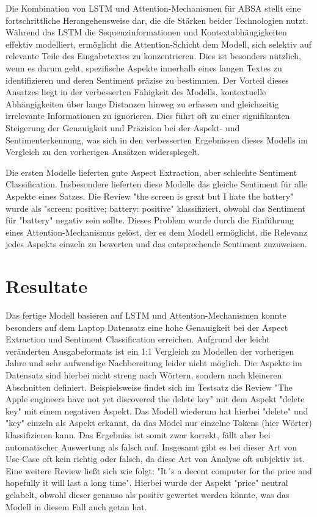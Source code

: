 \documentclass[12pt]{article}
\begin{document}
Die Kombination von LSTM und Attention-Mechanismen für ABSA stellt eine fortschrittliche Herangehensweise dar, die die Stärken beider Technologien nutzt. Während das LSTM die Sequenzinformationen und Kontextabhängigkeiten effektiv modelliert, ermöglicht die Attention-Schicht dem Modell, sich selektiv auf relevante Teile des Eingabetextes zu konzentrieren. Dies ist besonders nützlich, wenn es darum geht, spezifische Aspekte innerhalb eines langen Textes zu identifizieren und deren Sentiment präzise zu bestimmen. Der Vorteil dieses Ansatzes liegt in der verbesserten Fähigkeit des Modells, kontextuelle Abhängigkeiten über lange Distanzen hinweg zu erfassen und gleichzeitig irrelevante Informationen zu ignorieren. Dies führt oft zu einer signifikanten Steigerung der Genauigkeit und Präzision bei der Aspekt- und Sentimenterkennung, was sich in den verbesserten Ergebnissen dieses Modells im Vergleich zu den vorherigen Ansätzen widerspiegelt.

Die ersten Modelle lieferten gute Aspect Extraction, aber schlechte Sentiment Classification. Insbesondere lieferten diese Modelle das gleiche Sentiment 
für alle Aspekte eines Satzes. Die Review "the screen is great but I hate the battery" wurde als "screen: positive; battery: positive" 
klassifiziert, obwohl das Sentiment für "battery" negativ sein sollte. Dieses Problem wurde durch die Einführung eines Attention-Mechanismus gelöst, 
der es dem Modell ermöglicht, die Relevanz jedes Aspekts einzeln zu bewerten und das entsprechende Sentiment zuzuweisen.

\section{Resultate}

Das fertige Modell basieren auf LSTM und Attention-Mechanismen konnte besonders auf dem Laptop Datensatz eine hohe Genauigkeit bei der Aspect Extraction und Sentiment Classification erreichen. Aufgrund der leicht veränderten Ausgabeformats ist ein 1:1 Vergleich zu Modellen der vorherigen Jahre und sehr aufwendige Nachbereitung leider nicht möglich. Die Aspekte im Datensatz sind hierbei nicht streng nach Wörtern, sondern nach kleineren Abschnitten definiert. Beispielsweise findet sich im Testsatz die Review "The Apple engineers have not yet discovered the delete key" mit dem Aspekt "delete key" mit einem negativen Aspekt. Das Modell wiederum hat hierbei "delete" und "key" einzeln als Aspekt erkannt, da das Model nur einzelne Tokens (hier Wörter) klassifizieren kann. Das Ergebniss ist somit zwar korrekt, fällt aber bei automatischer Auswertung als falsch auf.
Insgesamt gibt es bei dieser Art von Use-Case oft kein richtig oder falsch, da diese Art von Analyse oft subjektiv ist. Eine weitere Review ließt sich wie folgt: "It´s a decent computer for the price and hopefully it will last a long time". Hierbei wurde der Aspekt "price" neutral gelabelt, obwohl dieser genauso als positiv gewertet werden könnte, was das Modell in diesem Fall auch getan hat.
\end{document}
